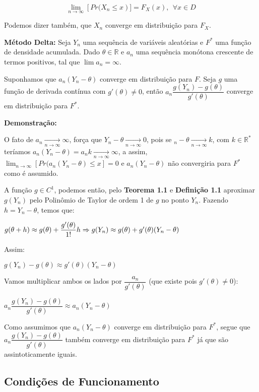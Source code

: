 \documentclass[12pt]{article}
\begin{document}
$$\displaystyle\lim_{n\to\infty}\left[Pr(X_n\leq x\right)]=F_X(x),~~\forall x\in D$$

Podemos dizer também, que $X_n$ converge em distribuição para $F_X$.


\textbf{Método Delta:}\cite{degroot2012probability}  Seja $Y_n$ uma sequência de variáveis aleatórias e $F^*$ uma função de densidade acumulada. Dado $\theta \in\mathbb{R}$ e $a_n$ uma sequência monótona crescente de termos positivos, tal que $\lim a_n=\infty$. 

Suponhamos que $a_n(Y_n-\theta)$ converge em distribuição para $F$. Seja $g$ uma função de derivada contínua com $g'(\theta)\neq0$, então $a_n\dfrac{g(Y_n)-g(\theta)}{g'(\theta)}$ converge em distribuição para $F^*$.

\textbf{Demonstração:}\cite{degroot2012probability}

O fato de $a_n\underset{n\to\infty}{\longrightarrow}\infty$, força que $Y_n-\theta\underset{n\to\infty}{\longrightarrow}0$, pois se $_n-\theta\underset{n\to\infty}{\longrightarrow}k$, com $k\in\mathbb{R}^*$ teríamos $a_n(Y_n-\theta)=a_nk\underset{n\to\infty}{\longrightarrow}\infty$, a assim, $\displaystyle\lim_{n\to\infty}[Pr(a_n(Y_n-\theta)\leq x]=0$ e $a_n(Y_n-\theta)$ não convergiria para $F^*$ como é assumido.

A função $g\in C^1$, podemos então, pelo \textbf{Teorema 1.1} e \textbf{Definição 1.1} aproximar $g(Y_n)$ pelo Polinômio de Taylor de ordem 1 de $g$ no ponto $Y_n$. Fazendo $h=Y_n-\theta$, temos que:

$g(\theta+h)\approx g(\theta)+\dfrac{g'(\theta)}{1!}h\Rightarrow\\
g(Y_n)\approx g(\theta)+g'(\theta)(Y_n-\theta)$

Assim:

$g(Y_n)-g(\theta) \approx g'(\theta)(Y_n-\theta)$

Vamos multiplicar ambos os lados por $\dfrac{a_n}{g'(\theta)}$ (que existe pois $g'(\theta)\neq0$):

$a_n\dfrac{g(Y_n)-g(\theta)}{g'(\theta)}\approx a_n(Y_n-\theta)$

Como assumimos que $a_n(Y_n-\theta)$ converge em distribuição para $F^*$, segue que $a_n\dfrac{g(Y_n)-g(\theta)}{g'(\theta)}$ também converge em distribuição para $F^*$ já que são assintoticamente iguais.

\subsection{Condições de Funcionamento}
\end{document}
